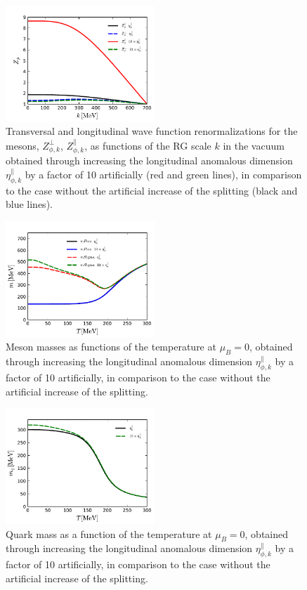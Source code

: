 \documentclass[aps,article,author-year,notitlepage,showpacs]{revtex4-1}
\begin{document}
%
\begin{figure}[htb]
\includegraphics[width=0.5\textwidth]{z}
\caption{Transversal and longitudinal wave function renormalizations for the mesons, $Z_{\phi,k}^{\perp}$, $Z_{\phi,k}^{\parallel}$, as functions of the RG scale $k$ in the vacuum obtained through increasing the longitudinal anomalous dimension $\eta_{\phi,k}^{\parallel}$ by a factor of 10 artificially (red and green lines), in comparison to the case without the artificial increase of the splitting (black and blue lines).}\label{fig:z}
\end{figure}
%

%
\begin{figure}[htb]
\includegraphics[width=0.5\textwidth]{m}
\caption{Meson masses as functions of the temperature at $\mu_B=0$, obtained through increasing the longitudinal anomalous dimension $\eta_{\phi,k}^{\parallel}$ by a factor of 10 artificially, in comparison to the case without the artificial increase of the splitting.}\label{fig:m}
\end{figure}
%

%
\begin{figure}[htb]
\includegraphics[width=0.5\textwidth]{mf}
\caption{Quark mass as a function of the temperature at $\mu_B=0$, obtained through increasing the longitudinal anomalous dimension $\eta_{\phi,k}^{\parallel}$ by a factor of 10 artificially, in comparison to the case without the artificial increase of the splitting.}\label{fig:mf}
\end{figure}
%
\end{document}
